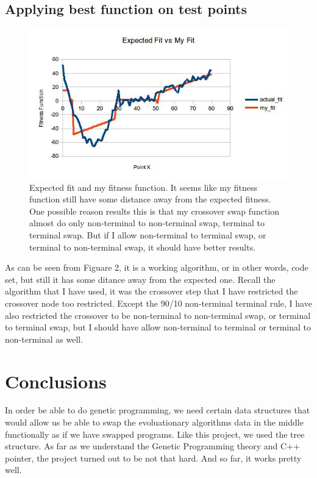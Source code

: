 \documentclass[10pt,b5paper]{article}
\begin{document}
\subsection{Applying best function on test points}
\label{sec-2-2}
\begin{figure}[htb]
\centering
\includegraphics[width=.9\linewidth]{./fit3.jpg}
\caption{Expected fit and my fitness function. It seems like my fitness function still have some distance away from the expected fitness. One possible reason results this is that my crossover swap function almost do only non-terminal to non-terminal swap, terminal to terminal swap. But if I allow non-terminal to terminal swap, or terminal to non-terminal swap, it should have better results.}
\end{figure}
As can be seen from Figuare 2, it is a working algorithm, or in other words, code set, but still it has some ditance away from the expected one. Recall the algorithm that I have used, it was the crossover step that I have restricted the crossover node too restricted. Except the 90/10 non-terminal terminal rule, I have also restricted the crossover to be non-terminal to non-terminal swap, or terminal to terminal swap, but I should have allow non-terminal to terminal or terminal to non-terminal as well. 
\section{Conclusions}
\label{sec-3}
In order be able to do genetic programming, we need certain data structures that would allow us be able to swap the evoluationary algorithms data in the middle functionally as if we have swapped programs. Like this project, we used the tree structure. As far as we understand the Genetic Programming theory and C++ pointer, the project turned out to be not that hard. And so far, it works pretty well. 
\end{document}
